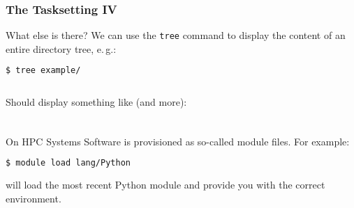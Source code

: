 \begin{frame}[fragile]
  \frametitle{The Tasksetting IV}
  What else is there?\newline
  We can use the \texttt{tree} command to display the content of an entire directory tree, e.\,g.:
  \begin{lstlisting}[language=Bash, style=Shell]
$ tree example/
  \end{lstlisting}
  \begin{columns}
    \begin{column}{0.2\textwidth}
    \footnotesize
     Should display something like (and more):
    \end{column}
    \begin{column}{0.8\textwidth}
    \begin{minipage}[t]{0.5\textwidth}
            {\tiny \DTsetlength{0.2em}{1em}{0.2em}{0.4pt}{.6pt}
}
    \end{minipage}






    \end{column}
  \end{columns}
\end{frame}

\begin{frame}[fragile]
  \frametitle{}
  On HPC Systems Software is provisioned as so-called module files. For example:
  \begin{lstlisting}[language=Bash, style=Shell]
$ module load lang/Python
  \end{lstlisting}
  will load the most recent Python module and provide you with the correct environment.
\end{frame}

